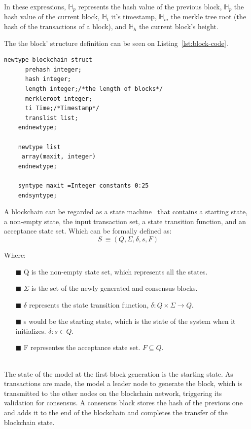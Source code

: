 \documentclass[sigconf, nonacm]{acmart}
\begin{document}
  In these expressions, $\mathbb{H}_p$ represents the hash value of the previous block, 
  $\mathbb{H}_p$ the hash value of the current block, $\mathbb{H}_t$ it's timestamp, 
  $\mathbb{H}_m$ the merkle tree root (the hash of the transactions of a block), and $\mathbb{H}_h$ the current block's height.

  The the block' structure definition can be seen on Listing~\ref{lst:block-code}.
  
  \begin{lstlisting}[frame=single,label={lst:block-code},
    caption={Definition of a block's structure},captionpos=b, basicstyle=\ttfamily\small]
    newtype blockchain struct
      prehash integer;
      hash integer;
      length integer;/*the length of blocks*/
      merkleroot integer;
      ti Time;/*Timestamp*/
      translist list;
    endnewtype;

    newtype list
     array(maxit, integer)
    endnewtype;
 
    syntype maxit =Integer constants 0:25
    endsyntype;
  \end{lstlisting}
  
  A blockchain can be regarded as a state machine~\cite{Duan2018} that contains a starting state, a non-empty state, the input transaction set,
  a state transition function, and an acceptance state set. Which can be formally defined as:
    \begin{displaymath}
      S~\equiv(Q,\Sigma,\delta,s,F)
    \end{displaymath}

  Where:

  \begin{enumerate}
    \item[$\blacksquare$] Q is the non-empty state set, which represents all the states.
    \item[$\blacksquare$] $\Sigma$ is the set of the newly generated and consensus blocks. 
    \item[$\blacksquare$] $\delta$ represents the state transition function,
      \begin{math}
        \delta: Q \times \Sigma \rightarrow Q
      \end{math}.
    \item[$\blacksquare$] s would be the starting state, which is the state of the system when it initializes.
      \begin{math}
        \delta: s \in Q
      \end{math}.
    \item[$\blacksquare$] F representes the acceptance state set.
      \begin{math}
        F \subseteq Q
      \end{math}.
  \end{enumerate}
  \  \\ %
  The state of the model at the first block generation is the starting state.
  As transactions are made, the model a leader node to generate the block, which is transmitted to the other nodes on the blockchain network,
  triggering its validation for consensus. 
  A consensus block stores the hash of the previous one and adds it to the end of the blockchain and completes the transfer of the blockchain state.
  
\end{document}
